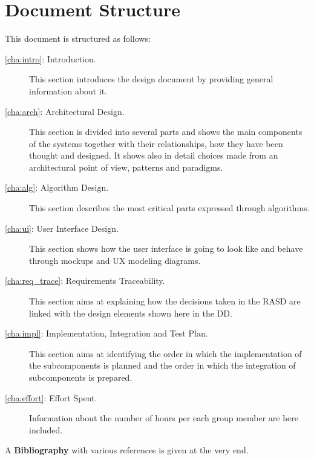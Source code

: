 \section{Document Structure}
\label{sec:structure}
This document is structured as follows:
\begin{description}
\item[\autoref{cha:intro}: Introduction.] This section introduces the design document by providing general information about it.
\item[\autoref{cha:arch}: Architectural Design.] This section is divided into several parts and shows the main components of the systems together with their relationships, how they have been thought and designed. It shows also in detail choices made from an architectural point of view, patterns and paradigms.
\item[\autoref{cha:alg}: Algorithm Design.] This section describes the most critical parts expressed through algorithms.
\item[\autoref{cha:ui}: User Interface Design.] This section shows how the user interface is going to look like and behave through mockups and UX modeling diagrams.
\item[\autoref{cha:req_trace}: Requirements Traceability.] This section aims at explaining how the decisions taken in the RASD are linked with the design elements shown here in the DD.
\item[\autoref{cha:impl}: Implementation, Integration and Test Plan.] This section aims at identifying the order in which the implementation of the subcomponents is planned and the order in which the integration of subcomponents is prepared.
\item[\autoref{cha:effort}: Effort Spent.] Information about the number of hours per each group member are here included.
\end{description}
A \textbf{Bibliography} with various references is given at the very end.
